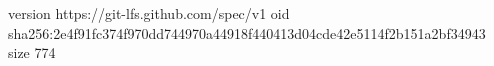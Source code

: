 version https://git-lfs.github.com/spec/v1
oid sha256:2e4f91fc374f970dd744970a44918f440413d04cde42e5114f2b151a2bf34943
size 774
